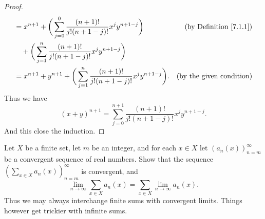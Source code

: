 \begin{proof}
\begin{align*}
         & = x^{n + 1} + \bigg(\sum_{j = 0}^0 \frac{(n + 1)!}{j!(n + 1 - j)!} x^j y^{n + 1 - j}\bigg)              & \text{(by Definition \ref{7.1.1})} \\
         & \quad + \bigg(\sum_{j = 1}^n \frac{(n + 1)!}{j!(n + 1 - j)!} x^j y^{n + 1 - j}\bigg)                                                         \\
         & = x^{n + 1} + y^{n + 1} + \bigg(\sum_{j = 1}^n \frac{(n + 1)!}{j!(n + 1 - j)!} x^j y^{n + 1 - j}\bigg). & \text{(by the given condition)}
    \end{align*}
    Thus we have
    \[
        (x + y)^{n + 1} = \sum_{j = 0}^{n + 1} \frac{(n + 1)!}{j!(n + 1 - j)!} x^j y^{n + 1 - j}.
    \]
    And this close the induction.
\end{proof}

\begin{exercise}\label{ex 7.1.5}
    Let \(X\) be a finite set, let \(m\) be an integer, and for each \(x \in X\) let \((a_n(x))_{n = m}^\infty\) be a convergent sequence of real numbers.
    Show that the sequence \((\sum_{x \in X} a_n(x))_{n = m}^\infty\) is convergent, and
    \[
        \lim_{n \to \infty} \sum_{x \in X} a_n(x) = \sum_{x \in X} \lim_{n \to \infty} a_n(x).
    \]
    Thus we may always interchange finite sums with convergent limits.
    Things however get trickier with infinite sums.
\end{exercise}

